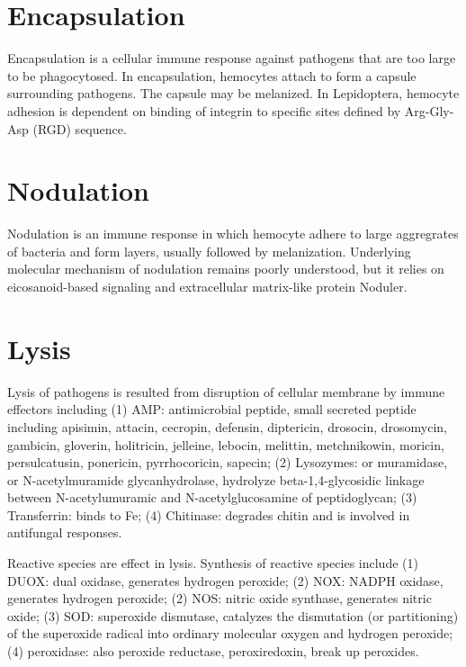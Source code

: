 \documentclass[11pt]{article}
\begin{document}
\begin{sloppypar}
\section*{Encapsulation}
Encapsulation is a cellular immune response against pathogens that are too large to be phagocytosed. 
In encapsulation, hemocytes attach to form a capsule surrounding pathogens. 
The capsule may be melanized. 
In Lepidoptera, hemocyte adhesion is dependent on binding of integrin to specific sites defined by Arg-Gly-Asp (RGD) sequence. 

\section*{Nodulation}
Nodulation is an immune response in which hemocyte adhere to large aggregrates of bacteria and form layers, usually followed by melanization. 
Underlying molecular mechanism of nodulation remains poorly understood, but it relies on eicosanoid-based signaling and extracellular matrix-like protein Noduler. 

\section*{Lysis}
Lysis of pathogens is resulted from disruption of cellular membrane by immune effectors including 
\newline
(1) AMP: antimicrobial peptide, small secreted peptide including apisimin, attacin, cecropin, defensin, diptericin, drosocin, drosomycin, gambicin, gloverin, holitricin, jelleine, lebocin, melittin, metchnikowin, moricin, persulcatusin, ponericin, pyrrhocoricin, sapecin; \newline
(2) Lysozymes: or muramidase, or N-acetylmuramide glycanhydrolase, hydrolyze beta-1,4-glycosidic linkage between N-acetylumuramic and N-acetylglucosamine of peptidoglycan; \newline
(3) Transferrin: binds to Fe; \newline
(4) Chitinase: degrades chitin and is involved in antifungal responses.

\par

Reactive species are effect in lysis. 
Synthesis of reactive species include 
\newline
(1) DUOX: dual oxidase, generates hydrogen peroxide; \newline
(2) NOX: NADPH oxidase, generates hydrogen peroxide; \newline
(2) NOS: nitric oxide synthase, generates nitric oxide; \newline
(3) SOD: superoxide dismutase, catalyzes the dismutation (or partitioning) of the superoxide radical into ordinary molecular oxygen and hydrogen peroxide; \newline
(4) peroxidase: also peroxide reductase, peroxiredoxin, break up peroxides.  


\end{sloppypar}
\end{document}
